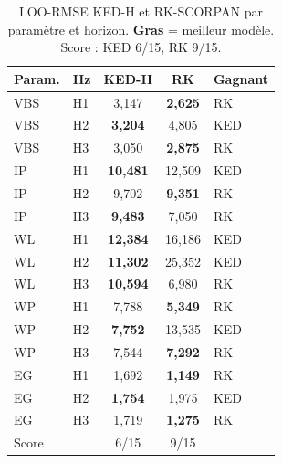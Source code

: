 \documentclass[10pt,a4paper,twocolumn]{article}
\begin{document}
\begin{table}[htbp]
\centering\small
\caption{LOO-RMSE KED-H et RK-SCORPAN par paramètre et horizon.
  \textbf{Gras} = meilleur modèle. Score : KED 6/15, RK 9/15.}
\label{tab:loo_complet}
\setlength{\tabcolsep}{4pt}
\begin{tabular}{llccl}
\toprule
Param. & Hz & KED-H & RK & Gagnant \\
\midrule
VBS & H1 & 3,147 & \textbf{2,625} & RK \\
VBS & H2 & \textbf{3,204} & 4,805 & KED \\
VBS & H3 & 3,050 & \textbf{2,875} & RK \\
IP  & H1 & \textbf{10,481} & 12,509 & KED \\
IP  & H2 & 9,702 & \textbf{9,351} & RK \\
IP  & H3 & \textbf{9,483} & 7,050 & RK \\
WL  & H1 & \textbf{12,384} & 16,186 & KED \\
WL  & H2 & \textbf{11,302} & 25,352 & KED \\
WL  & H3 & \textbf{10,594} & 6,980 & RK \\
WP  & H1 & 7,788 & \textbf{5,349} & RK \\
WP  & H2 & \textbf{7,752} & 13,535 & KED \\
WP  & H3 & 7,544 & \textbf{7,292} & RK \\
EG  & H1 & 1,692 & \textbf{1,149} & RK \\
EG  & H2 & \textbf{1,754} & 1,975 & KED \\
EG  & H3 & 1,719 & \textbf{1,275} & RK \\
\midrule
\multicolumn{2}{l}{Score} & 6/15 & 9/15 & \\
\bottomrule
\end{tabular}
\end{table}
\end{document}
